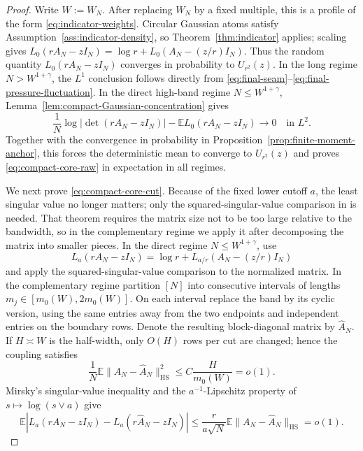 \documentclass[11pt,reqno]{amsart}
\numberwithin{equation}{section}
\theoremstyle{definition}
\theoremstyle{remark}
\newcommand{\E}{\mathbb E}
\newcommand{\1}{\mathbf 1}
\newcommand{\HS}{\mathrm{HS}}
\begin{document}
\begin{proof}
Write \(W:=W_N\).
After replacing $W_N$ by a fixed multiple, this is a profile of the form
\eqref{eq:indicator-weights}.  Circular Gaussian atoms satisfy
Assumption~\ref{ass:indicator-density}, so
Theorem~\ref{thm:indicator} applies; scaling gives
\(L_0(rA_N-zI_N)=\log r+L_0(A_N-(z/r)I_N)\).  Thus the random
quantity \(L_0(rA_N-zI_N)\) converges in probability to
\(U_{r^2}(z)\).  In the long regime \(N>W^{1+\gamma}\), the
$L^1$ conclusion follows directly from
\eqref{eq:final-seam}--\eqref{eq:final-pressure-fluctuation}.  In the direct
high-band regime $N\le W^{1+\gamma}$, Lemma~\ref{lem:compact-Gaussian-concentration} gives
\[
 \frac1N\log|\det(rA_N-zI_N)|
 -\E L_0(rA_N-zI_N)\longrightarrow0
 \quad\text{in }L^2.
\]
Together with the convergence in probability in
Proposition~\ref{prop:finite-moment-anchor}, this forces the deterministic
mean to converge to $U_{r^2}(z)$ and proves
\eqref{eq:compact-core-raw} in expectation in all regimes.

We next prove \eqref{eq:compact-core-cut}.  Because of the fixed lower
cutoff \(a\), the least singular value no longer matters; only the
squared-singular-value comparison in
\cite[Theorem~3.6]{Han2410} is needed.  That theorem requires the matrix
size not to be too large relative to the bandwidth, so in the
complementary regime we apply it after decomposing the matrix into
smaller pieces.  In the direct regime \(N\leq W^{1+\gamma}\), use
\begin{equation}\label{eq:fixed-scale-La}
 L_a(rA_N-zI_N)=\log r+L_{a/r}(A_N-(z/r)I_N)
\end{equation}
and apply the squared-singular-value comparison
\cite[Theorem~3.6]{Han2410} to the normalized matrix.  In the complementary
regime partition
$[N]$ into consecutive intervals of lengths
$m_j\in[m_0(W),2m_0(W)]$.  On each interval replace the band by its cyclic
version, using the same entries away from the two endpoints and independent
entries on the boundary rows.  Denote the resulting block-diagonal matrix
by $\widehat A_N$.  If $H\asymp W$ is the half-width, only $O(H)$ rows per
cut are changed; hence the coupling satisfies
\begin{equation}\label{eq:periodicization-HS}
 \frac1N\E\|A_N-\widehat A_N\|_{\HS}^2
 \le C\frac H{m_0(W)}=o(1).
\end{equation}
Mirsky's singular-value inequality \cite{Mirsky1960} and the
$a^{-1}$-Lipschitz property of
$s\mapsto\log(s\vee a)$ give
\begin{equation}\label{eq:periodicization-La}
 \E|L_a(rA_N-zI_N)-L_a(r\widehat A_N-zI_N)|
 \le\frac r{a\sqrt N}\E\|A_N-\widehat A_N\|_{\HS}=o(1).
\end{equation}


\end{proof}
\end{document}

